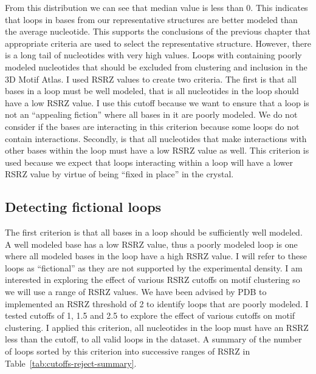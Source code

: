 From this distribution we can see that median value is less than 0. This
indicates that loops in bases from our representative structures are better
modeled than the average nucleotide. This supports the conclusions of the
previous chapter that appropriate criteria are used to select the representative
structure. However, there is a long tail of nucleotides with very high values.
Loops with containing poorly modeled nucleotides that should be excluded from
clustering and inclusion in the 3D Motif Atlas. I used RSRZ values to create two
criteria. The first is that all bases in a loop must be well modeled, that is
all nucleotides in the loop should have a low RSRZ value. I use this cutoff
because we want to ensure that a loop is not an ``appealing fiction'' where all
bases in it are poorly modeled. We do not consider if the bases are interacting
in this criterion because some loops do not contain interactions. Secondly, is
that all nucleotides that make interactions with other bases within the loop
must have a low RSRZ value as well. This criterion is used because we expect
that loops interacting within a loop will have a lower RSRZ value by virtue of
being ``fixed in place'' in the crystal.

\subsection{Detecting fictional loops}

The first criterion is that all bases in a loop should be sufficiently well
modeled. A well modeled base has a low RSRZ value, thus a poorly modeled loop is
one where all modeled bases in the loop have a high RSRZ value. I will refer to
these loops as ``fictional'' as they are not supported by the experimental
density. I am interested in exploring the effect of various RSRZ cutoffs on
motif clustering so we will use a range of RSRZ values. We have been advised by PDB
to implemented an RSRZ threshold of 2 to identify loops that are poorly modeled.
I tested cutoffs of 1, 1.5 and 2.5 to explore the effect of various cutoffs on
motif clustering. I applied this criterion, all nucleotides in the loop must
have an RSRZ less than the cutoff, to all valid loops in the dataset. A summary
of the number of loops sorted by this criterion into successive ranges of RSRZ
in Table~\ref{tab:cutoffs-reject-summary}.

